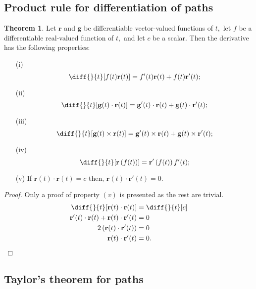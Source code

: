 \documentclass[12pt, a4paper]{article}
\newcommand{\mb}[1]{\mathbf{#1}}
\theoremstyle{definition}
\newtheorem{theorem}{Theorem}[section]
\theoremstyle{plain}
\begin{document}
\subsection{Product rule for differentiation of paths}

\begin{theorem}
Let $\mb{r}$ and $\mb{g}$ be differentiable vector-valued functions of $t,$ let $f$ be a differentiable real-valued function of $t,$ and let $c$ be a scalar. Then the derivative has the following properties:
\begin{enumerate}
	
	\item[(i)] $$\diff{}{t}[f(t)\mathbf{r}(t)] = f'(t)\mathbf{r}(t) + f(t)\mathbf{r}'(t);$$

	\item[(ii)] $$\diff{}{t}[\mathbf{g}(t)\cdot \mathbf{r}(t)] = \mathbf{g}'(t)\cdot \mathbf{r}(t) + \mathbf{g}(t)\cdot \mathbf{r}'(t);$$

	\item[(iii)] $$\diff{}{t}[\mathbf{g}(t)\times \mathbf{r}(t)] = \mathbf{g}'(t)\times \mathbf{r}(t) + \mathbf{g}(t)\times \mathbf{r}'(t);$$

	\item[(iv)] $$\diff{}{t}[\mb{r}\left(f(t)\right)]=\mb{r'}\left(f(t)\right)f'(t);$$

	\item[(v)] If $\mb{r}(t)\cdot \mb{r}(t) =c$ then, $\mb{r}(t)\cdot \mb{r'}(t)=0.$

\end{enumerate}
\end{theorem}

\begin{proof}
Only a proof of property $(v)$ is presented as the rest are trivial. 
$$\begin{aligned}
\diff{}{t}[\mb{r}(t)\cdot \mb{r}(t)]&= \diff{}{t}[c] \\
\mathbf{r}'(t)\cdot \mathbf{r}(t) + \mathbf{r}(t)\cdot \mathbf{r}'(t) &= 0\\
2\left(\mathbf{r}(t)\cdot \mathbf{r}'(t)\right) &=0 \\
\mathbf{r}(t)\cdot \mathbf{r}'(t) &= 0.
\end{aligned}$$
\end{proof}

\subsection{Taylor's theorem for paths}
\end{document}
